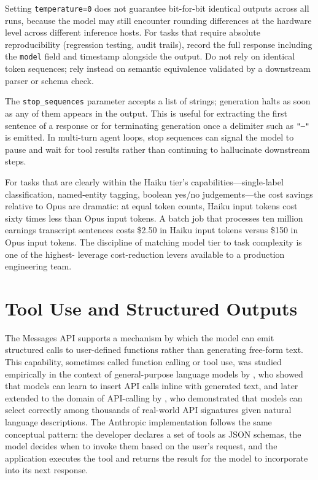 \begin{remark}
\label{rem:temperature-zero}
Setting \texttt{temperature=0} does not guarantee bit-for-bit identical outputs across
all runs, because the model may still encounter rounding differences at the hardware
level across different inference hosts. For tasks that require absolute reproducibility
(regression testing, audit trails), record the full response including the
\texttt{model} field and timestamp alongside the output. Do not rely on identical token
sequences; rely instead on semantic equivalence validated by a downstream parser or
schema check.
\end{remark}

The \texttt{stop\_sequences} parameter accepts a list of strings; generation halts as
soon as any of them appears in the output. This is useful for extracting the first
sentence of a response or for terminating generation once a delimiter such as
\texttt{"---"} is emitted. In multi-turn agent loops, stop sequences can signal the
model to pause and wait for tool results rather than continuing to hallucinate
downstream steps.

For tasks that are clearly within the Haiku tier's capabilities---single-label
classification, named-entity tagging, boolean yes/no judgements---the cost savings
relative to Opus are dramatic: at equal token counts, Haiku input tokens cost sixty
times less than Opus input tokens. A batch job that processes ten million earnings
transcript sentences costs \$2.50 in Haiku input tokens versus \$150 in Opus input
tokens. The discipline of matching model tier to task complexity is one of the highest-
leverage cost-reduction levers available to a production engineering team.

\section{Tool Use and Structured Outputs}
\label{app:sdk-commercial:tools}

The Messages API supports a mechanism by which the model can emit structured calls to
user-defined functions rather than generating free-form text. This capability,
sometimes called function calling or tool use, was studied empirically in the context
of general-purpose language models by \citet{schick2023toolformer}, who showed that
models can learn to insert API calls inline with generated text, and later extended to
the domain of API-calling by \citet{patil2023gorilla}, who demonstrated that models
can select correctly among thousands of real-world API signatures given natural
language descriptions. The Anthropic implementation follows the same conceptual pattern:
the developer declares a set of tools as JSON schemas, the model decides when to invoke
them based on the user's request, and the application executes the tool and returns the
result for the model to incorporate into its next response.

